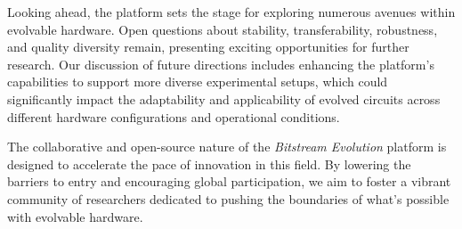\documentclass{ieeeaccess}
\begin{document}
Looking ahead, the platform sets the stage for exploring numerous avenues within evolvable hardware. Open questions about stability, transferability, robustness, and quality diversity remain, presenting exciting opportunities for further research. Our discussion of future directions includes enhancing the platform's capabilities to support more diverse experimental setups, which could significantly impact the adaptability and applicability of evolved circuits across different hardware configurations and operational conditions. 

The collaborative and open-source nature of the \textit{Bitstream Evolution} platform is designed to accelerate the pace of innovation in this field. By lowering the barriers to entry and encouraging global participation, we aim to foster a vibrant community of researchers dedicated to pushing the boundaries of what's possible with evolvable hardware.
\end{document}
